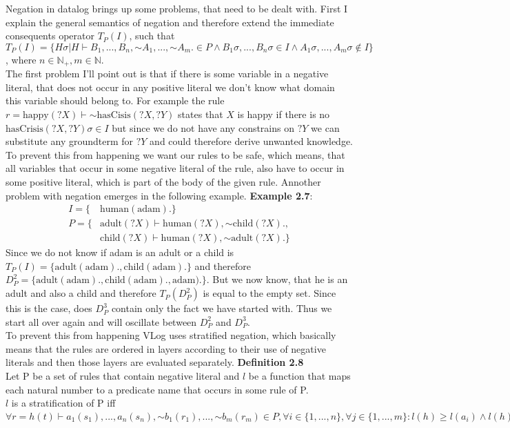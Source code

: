 \documentclass[hyperref, bachelorofscience]{cgvpub}
\renewenvironment{shaded}{%
  \def\FrameCommand{\fboxsep=\FrameSep \colorbox{shadecolor}}%
  \MakeFramed{\advance\hsize-\width \FrameRestore\FrameRestore}}%
 {\endMakeFramed}
\begin{document}
Negation in datalog brings up some problems, that need to be dealt with. First I explain the general semantics of negation and therefore extend the immediate consequents operator $T_P(I)$, such that $T_P(I) = \{ H\sigma | H \vdash B_1, ..., B_n, \mathord{\sim} A_1, ... ,\mathord{\sim} A_m . \in P \land B_1\sigma,...,B_n\sigma \in I \land A_1\sigma,...,A_m\sigma \notin I \}$, where $n \in \mathbb{N}_{+}, m \in \mathbb{N}$. \\
The first problem I'll point out is that if there is some variable in a negative literal, that does not occur in any positive literal we don't know what domain this variable should belong to. For example the rule $r = \text{happy}(?X) \vdash \mathord{\sim} \text{hasCisis}(?X,?Y)$ states that $X$  is happy if there is no $\text{hasCrisis}(?X,?Y)\sigma \in I$ but since we do not have any constrains on $?Y$ we can substitute any groundterm for $?Y$ and could therefore derive unwanted knowledge. To prevent this from happening we want our rules to be safe, which means, that all variables that occur in some negative literal of the rule, also have to occur in some positive literal, which is part of the body of the given rule.
Annother problem with negation emerges in the following example.
\begin{shaded}
\textbf{Example 2.7}: 
\begin{align*}
I =  \{ & \text{human}(\text{adam}).\} \\
P =  \{ & \text{adult}(?X) \vdash \text{human}(?X), \mathord{\sim} \text{child}(?X).,\\
& \text{child}(?X) \vdash \text{human}(?X), \mathord{\sim} \text{adult}(?X). \}
\end{align*}
\end{shaded}
Since we do not know if adam is an adult or a child is $T_P(I) = \{ \text{adult}(\text{adam})., \text{child}(\text{adam}). \}$ and therefore $D^2_P = \{\text{adult}(\text{adam})., \text{child}(\text{adam})., \text{adam}). \} $. But we now know, that he is an adult and also a child and therefore $T_P(D^2_P)$ is equal to the empty set. Since this is the case, does $D^3_P$ contain only the fact we have started with. Thus we start all over again and will oscillate between $D^2_P$ and $D^3_P$.\\
To prevent this from happening VLog uses stratified negation, which basically means that the rules are ordered in layers according to their use of negative literals and then those layers are evaluated separately.
\begin{shaded}
\textbf{Definition 2.8}\\
Let P be a set of rules that contain negative literal and $l$ be a function that maps each natural number to a predicate name that occurs in some rule of P. \\
$l$ is a stratification of P iff  $\forall r = h(t) \vdash a_1(s_1),...,a_n(s_n), \mathord{\sim} b_1(r_1),..., \mathord{\sim}b_m(r_m) \in P, \forall i \in \{1,...,n\}, \forall j \in \{ 1,...,m \}: l(h)\geq l(a_i) \land l(h) > l(b_j)$
\end{shaded}
\end{document}
